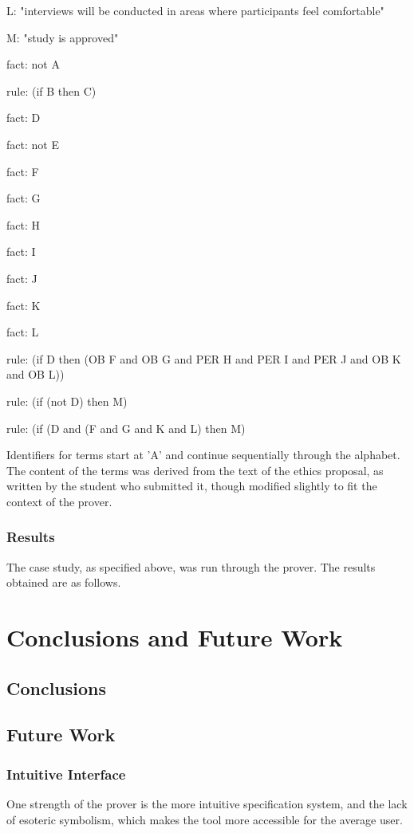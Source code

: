 \documentclass{l4proj}
\begin{document}
L: "interviews will be conducted in areas where participants feel comfortable"

M: "study is approved"

fact: not A

rule: (if B then C)

fact: D

fact: not E

fact: F

fact: G

fact: H

fact: I

fact: J 

fact: K

fact: L

rule: (if D then (OB F and OB G and PER H and PER I and PER J and OB K and OB L))

rule: (if (not D) then M)

rule: (if (D and (F and G and K and L) then M)

Identifiers for terms start at 'A' and continue sequentially through the alphabet. The content of the terms was derived from the text of the ethics proposal, as written by the student who submitted it, though modified slightly to fit the context of the prover. 

\subsection{Results}

The case study, as specified above, was run through the prover. The results obtained are as follows. 

\chapter{Conclusions and Future Work}

\section{Conclusions}

\section{Future Work}

\subsection{Intuitive Interface}
One strength of the prover is the more intuitive specification system, and the lack of esoteric symbolism, which makes the tool more accessible for the average user. 
\end{document}

